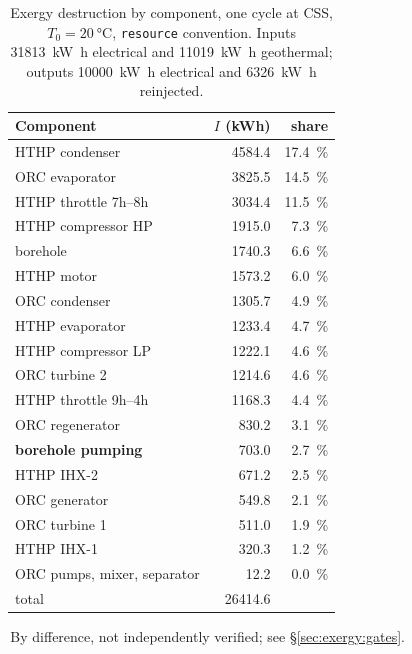 \begin{table}[htbp]
  \centering
  \caption{Exergy destruction by component, one cycle at CSS,
  $T_0 = \SI{20}{\celsius}$, \texttt{resource} convention. Inputs
  \SI{31813}{\kilo\watt\hour} electrical and \SI{11019}{\kilo\watt\hour}
  geothermal; outputs \SI{10000}{\kilo\watt\hour} electrical and
  \SI{6326}{\kilo\watt\hour} reinjected.}
  \label{tab:exergy:components}
  \begin{tabular}{lrr}
    \toprule
    Component & $I$ (kWh) & share \\
    \midrule
    HTHP condenser        & 4584.4 & \SI{17.4}{\percent} \\
    ORC evaporator        & 3825.5 & \SI{14.5}{\percent} \\
    HTHP throttle 7h--8h  & 3034.4 & \SI{11.5}{\percent} \\
    HTHP compressor HP    & 1915.0 & \SI{7.3}{\percent} \\
    borehole\footnotemark[1] & 1740.3 & \SI{6.6}{\percent} \\
    HTHP motor            & 1573.2 & \SI{6.0}{\percent} \\
    ORC condenser         & 1305.7 & \SI{4.9}{\percent} \\
    HTHP evaporator       & 1233.4 & \SI{4.7}{\percent} \\
    HTHP compressor LP    & 1222.1 & \SI{4.6}{\percent} \\
    ORC turbine 2         & 1214.6 & \SI{4.6}{\percent} \\
    HTHP throttle 9h--4h  & 1168.3 & \SI{4.4}{\percent} \\
    ORC regenerator       &  830.2 & \SI{3.1}{\percent} \\
    \textbf{borehole pumping} &  703.0 & \SI{2.7}{\percent} \\
    HTHP IHX-2            &  671.2 & \SI{2.5}{\percent} \\
    ORC generator         &  549.8 & \SI{2.1}{\percent} \\
    ORC turbine 1         &  511.0 & \SI{1.9}{\percent} \\
    HTHP IHX-1            &  320.3 & \SI{1.2}{\percent} \\
    ORC pumps, mixer, separator & 12.2 & \SI{0.0}{\percent} \\
    \midrule
    total                 & 26414.6 & \\
    \bottomrule
  \end{tabular}

  \footnotesize\footnotemark[1]\,By difference, not independently verified;
  see \S\ref{sec:exergy:gates}.
\end{table}

